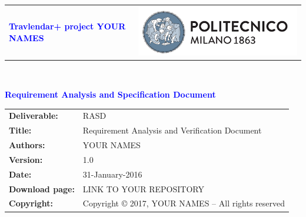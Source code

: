 




\begin{titlepage}



{\begin{table}[t!]
\centering
\begin{tabu} to \textwidth { X[1.3,r,p] X[1.7,l,p] }
\textcolor{Blue}
{\textbf{\small{Travlendar+ project YOUR NAMES}}} & \includegraphics[scale=0.5]{Images/PolimiLogo}
\end{tabu}
\end{table}}~\\ [7cm]


\begin{flushleft}

{\textcolor{Blue}{\textbf{\Huge{Requirement Analysis and Specification
        Document}}}} \\ [1cm]

\end{flushleft}

\end{titlepage}

\begin{table}[h!]
\begin{tabu} to \textwidth { X[0.3,r,p] X[0.7,l,p] }
\hline

\textbf{Deliverable:} & RASD\\
\textbf{Title:} & Requirement Analysis and Verification Document \\
\textbf{Authors:} & YOUR NAMES \\
\textbf{Version:} & 1.0 \\ 
\textbf{Date:} & 31-January-2016 \\
\textbf{Download page:} & LINK TO YOUR REPOSITORY \\
\textbf{Copyright:} & Copyright © 2017, YOUR NAMES – All rights reserved \\
\hline
\end{tabu}
\end{table}




